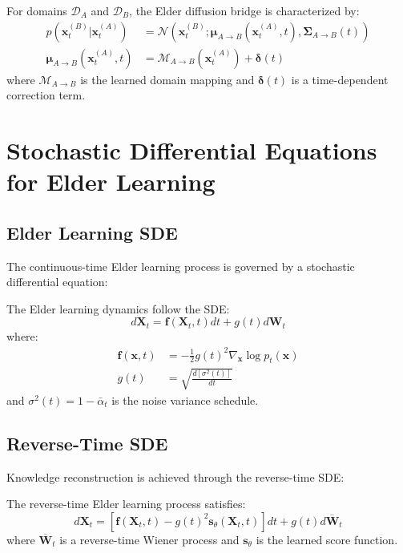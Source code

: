 \begin{theorem}
For domains $\mathcal{D}_A$ and $\mathcal{D}_B$, the Elder diffusion bridge is characterized by:
\begin{align}
p(\mathbf{x}_t^{(B)} | \mathbf{x}_t^{(A)}) &= \mathcal{N}(\mathbf{x}_t^{(B)}; \boldsymbol{\mu}_{A \to B}(\mathbf{x}_t^{(A)}, t), \boldsymbol{\Sigma}_{A \to B}(t)) \\
\boldsymbol{\mu}_{A \to B}(\mathbf{x}_t^{(A)}, t) &= \mathcal{M}_{A \to B}(\mathbf{x}_t^{(A)}) + \boldsymbol{\delta}(t)
\end{align}
where $\mathcal{M}_{A \to B}$ is the learned domain mapping and $\boldsymbol{\delta}(t)$ is a time-dependent correction term.
\end{theorem}

\section{Stochastic Differential Equations for Elder Learning}

\subsection{Elder Learning SDE}

The continuous-time Elder learning process is governed by a stochastic differential equation:

\begin{definition}
The Elder learning dynamics follow the SDE:
\begin{equation}
d\mathbf{X}_t = \mathbf{f}(\mathbf{X}_t, t) dt + g(t) d\mathbf{W}_t
\end{equation}
where:
\begin{align}
\mathbf{f}(\mathbf{x}, t) &= -\frac{1}{2} g(t)^2 \nabla_\mathbf{x} \log p_t(\mathbf{x}) \\
g(t) &= \sqrt{\frac{d[\sigma^2(t)]}{dt}}
\end{align}
and $\sigma^2(t) = 1 - \bar{\alpha}_t$ is the noise variance schedule.
\end{definition}

\subsection{Reverse-Time SDE}

Knowledge reconstruction is achieved through the reverse-time SDE:

\begin{theorem}
The reverse-time Elder learning process satisfies:
\begin{equation}
d\mathbf{X}_t = [\mathbf{f}(\mathbf{X}_t, t) - g(t)^2 \mathbf{s}_\theta(\mathbf{X}_t, t)] dt + g(t) d\overline{\mathbf{W}}_t
\end{equation}
where $\overline{\mathbf{W}}_t$ is a reverse-time Wiener process and $\mathbf{s}_\theta$ is the learned score function.
\end{theorem}

